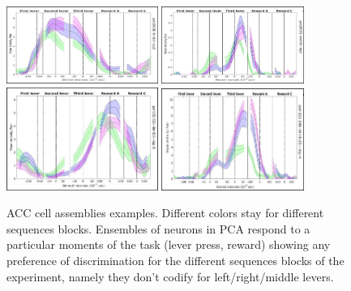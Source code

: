 \documentclass{article}
\begin{document}
\begin{figure}
    \centering
    \includegraphics[width=0.44\textwidth]{ACC1}
    \includegraphics[width=0.415\textwidth]{ACC2}
    \includegraphics[width=0.44\textwidth]{ACC3}
   \includegraphics[width=0.415\textwidth]{ACC4}
  \caption{\footnotesize{ACC cell assemblies examples. Different colors stay for different sequences blocks. Ensembles of neurons in PCA respond to a particular moments of the task (lever press, reward) showing any preference of discrimination for the different sequences blocks of the experiment, namely they don't codify for left/right/middle levers.}}
   \label{fig: ACC_assembly}
 \end{figure}
\end{document}
